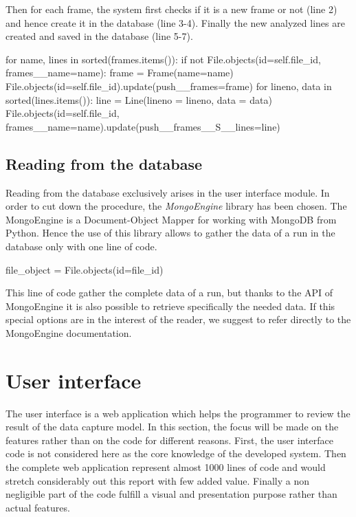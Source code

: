Then for each frame, the system first checks if it is a new frame or not (line 2) and hence create it in the database (line 3-4). Finally the new analyzed lines are created and saved in the database (line 5-7).
\begin{python}
for name, lines in sorted(frames.items()):
    if not File.objects(id=self.file_id, frames__name=name):
        frame = Frame(name=name)
        File.objects(id=self.file_id).update(push__frames=frame)
    for lineno, data in sorted(lines.items()):
        line = Line(lineno = lineno, data = data)
        File.objects(id=self.file_id, frames__name=name).update(push__frames__S__lines=line)
\end{python}

\subsection{Reading from the database}

Reading from the database exclusively arises in the user interface module. In order to cut down the procedure, the \textit{MongoEngine} library has been chosen. The MongoEngine is a Document-Object Mapper for working with MongoDB from Python. Hence the use of this library allows to gather the data of a run in the database only with one line of code.
\begin{python}
file_object = File.objects(id=file_id)
\end{python} 

This line of code gather the complete data of a run, but thanks to the API of MongoEngine it is also possible to retrieve specifically the needed data. If this special options are in the interest of the reader, we suggest to refer directly to the MongoEngine documentation.

\section{User interface}
The user interface is a web application which helps the programmer to review the result of the data capture model. In this section, the focus will be made on the features rather than on the code for different reasons. First, the user interface code is not considered here as the core knowledge of the developed system. Then the complete web application represent almost 1000 lines of code and would stretch considerably out this report with few added value. Finally a non negligible part of the code fulfill a visual and presentation purpose rather than actual features.

